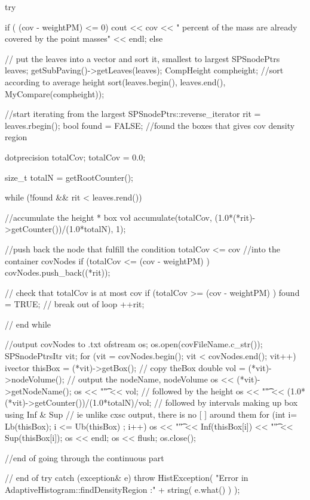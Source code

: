 \begin{DoxyCode}
{
  try {
      if ( (cov - weightPM) <= 0) {
        cout << cov << " percent of the mass are already covered by the point
       masses" << endl;
      }
      else {
        // put the leaves into a vector and sort it, smallest to largest
        SPSnodePtrs leaves;
        getSubPaving()->getLeaves(leaves);
        CompHeight compheight;
        //sort according to average height
        sort(leaves.begin(), leaves.end(), MyCompare(compheight));
        
        //start iterating from the largest
        SPSnodePtrs::reverse_iterator rit = leaves.rbegin();
        bool found = FALSE; //found the boxes that gives cov density region
        
        dotprecision totalCov;
        totalCov = 0.0;
        
        size_t totalN = getRootCounter();
        
        while (!found && rit < leaves.rend()) {
          //accumulate the height * box vo\l 
          accumulate(totalCov, (1.0*(*rit)->getCounter())/(1.0*totalN), 1); 

          //push back the node that fulfill the condition totalCov <= cov 
          //into the container covNodes
          if (totalCov <= (cov - weightPM) ) { 
            covNodes.push_back((*rit)); 
          } 
          
          // check that totalCov is at most cov
          if (totalCov >= (cov - weightPM) ) { found = TRUE; } // break out of
       loop
          ++rit;        
        } // end while 
      
      //output covNodes to .txt 
        ofstream os;
        os.open(covFileName.c_str());   
        SPSnodePtrsItr vit;
        for (vit = covNodes.begin(); vit < covNodes.end(); vit++) {
          ivector thisBox = (*vit)->getBox(); // copy theBox         
          double vol = (*vit)->nodeVolume();
          // output the nodeName, nodeVolume
          os << (*vit)->getNodeName();
          os << "\t" << vol;
          // followed by the height
          os << "\t" << (1.0*(*vit)->getCounter())/(1.0*totalN)/vol;
          // followed by intervals making up box using Inf & Sup
          // ie unlike cxsc output, there is no [  ] around them
          for (int i= Lb(thisBox); i <= Ub(thisBox) ; i++) {
             os << "\t" << Inf(thisBox[i]) << "\t" << Sup(thisBox[i]);
          }
          os << endl;
        }
        os << flush;
        os.close();
      } //end of going through the continuous part
    } // end of try     
  catch (exception& e) {
    throw HistException(
    "Error in AdaptiveHistogram::findDensityRegion :\n"
    + string( e.what() ) );
  }
}
\end{DoxyCode}
